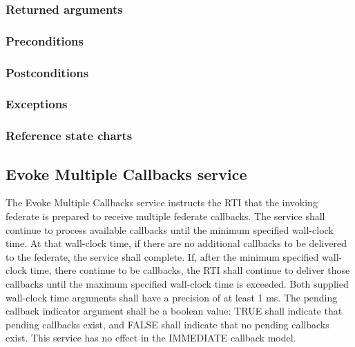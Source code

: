 \begin{compactstdpage}

    \subsubsection{Returned arguments}


    \subsubsection{Preconditions}


    \subsubsection{Postconditions}


    \subsubsection{Exceptions}


    \subsubsection{Reference state charts}


    \subsection{Evoke Multiple Callbacks service}

    The Evoke Multiple Callbacks service instructs the RTI that the invoking federate is prepared to receive multiple federate callbacks. The service shall continue to process available callbacks until the minimum specified wall-clock time. At that wall-clock time, if there are no additional callbacks to be delivered to the federate, the service shall complete. If, after the minimum specified wall-clock time, there continue to be callbacks, the RTI shall continue to deliver those callbacks until the maximum specified wall-clock time is exceeded. Both supplied wall-clock time arguments shall have a precision of at least 1 ms. The pending callback indicator argument shall be a boolean value: TRUE shall indicate that pending callbacks exist, and FALSE shall indicate that no pending callbacks exist. This service has no effect in the IMMEDIATE callback model.


\end{compactstdpage}
